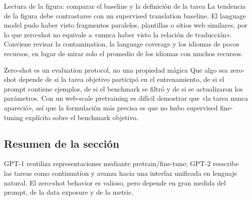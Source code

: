 
\begin{knowledgebox}{Lectura de la figura: comparar el baseline y la definición de la tarea}
La tendencia de la figura debe contrastarse con un supervised translation baseline. El language model pudo haber visto fragmentos paralelos, plantillas o sitios web similares, por lo que zero-shot no equivale a «nunca haber visto la relación de traducción». Conviene revisar la contamination, la language coverage y los idiomas de pocos recursos, en lugar de mirar solo el promedio de los idiomas con muchos recursos.
\end{knowledgebox}

\begin{warningbox}{Zero-shot es un evaluation protocol, no una propiedad mágica}
Que algo sea zero-shot depende de si la tarea objetivo participó en el entrenamiento, de si el prompt contiene ejemplos, de si el benchmark se filtró y de si se actualizaron los parámetros. Con un web-scale pretraining es difícil demostrar que «la tarea nunca apareció», así que la formulación más precisa es que no hubo supervised fine-tuning explícito sobre el benchmark objetivo.
\end{warningbox}

\subsection{Resumen de la sección}

GPT-1 reutiliza representaciones mediante pretrain/fine-tune; GPT-2 reescribe las tareas como continuation y avanza hacia una interfaz unificada en lenguaje natural. El zero-shot behavior es valioso, pero depende en gran medida del prompt, de la data exposure y de la metric.
